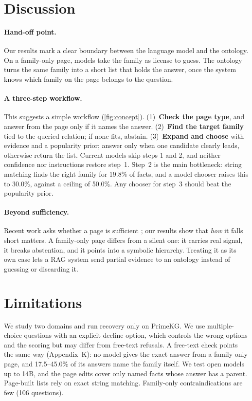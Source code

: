 \section{Discussion}

\paragraph{Hand-off point.}
Our results mark a clear boundary between the language model and the ontology. On a family-only page, models take the family as license to guess. The ontology turns the same family into a short list that holds the answer, once the system knows which family on the page belongs to the question.

\paragraph{A three-step workflow.}
This suggests a simple workflow (\cref{fig:concept}). (1)~\textbf{Check the page type}, and answer from the page only if it names the answer. (2)~\textbf{Find the target family} tied to the queried relation; if none fits, abstain. (3)~\textbf{Expand and choose} with evidence and a popularity prior; answer only when one candidate clearly leads, otherwise return the list. Current models skip steps 1 and 2, and neither confidence nor instructions restore step~1. Step~2 is the main bottleneck: string matching finds the right family for 19.8\% of facts, and a model chooser raises this to 30.0\%, against a ceiling of 50.0\%. Any chooser for step~3 should beat the popularity prior.

\paragraph{Beyond sufficiency.}
Recent work asks whether a page is sufficient \citep{joren2025sufficient}; our results show that \emph{how} it falls short matters. A family-only page differs from a silent one: it carries real signal, it breaks abstention, and it points into a symbolic hierarchy. Treating it as its own case lets a RAG system send partial evidence to an ontology instead of guessing or discarding it.

\section{Limitations}

We study two domains and run recovery only on PrimeKG. We use multiple-choice questions with an explicit decline option, which controls the wrong options and the scoring but may differ from free-text refusals. A free-text check points the same way (Appendix~K): no model gives the exact answer from a family-only page, and 17.5--45.0\% of its answers name the family itself. We test open models up to 14B, and the page edits cover only named facts whose answer has a parent. Page-built lists rely on exact string matching. Family-only contraindications are few (106 questions).

